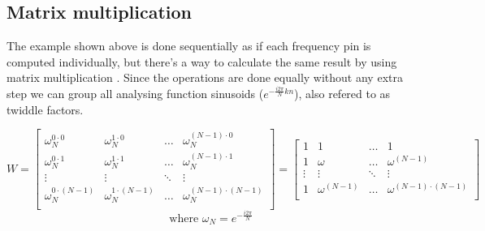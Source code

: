 \documentclass[
  oneside,
  11pt, a4paper,
  footinclude=true,
  headinclude=true,
  cleardoublepage=empty
]{scrbook}
\begin{document}

\subsection{Matrix multiplication} \label{subsec:matrix-multiplication}
The example shown above is done sequentially as if each frequency pin is computed individually, but there's a way to calculate the same result by using matrix multiplication \cite{rao2018transform}. Since the operations are done equally without any extra step we can group all analysing function sinusoids (\(e^{- \frac{i 2 \pi}{N} k n}\)), also refered to as twiddle factors.


\begin{equation*}
    W = 
    \begin{bmatrix}
        \omega_{N}^{0 \cdot 0}     & \omega_{N}^{1 \cdot 0}     & \dots  & \omega_{N}^{(N-1) \cdot 0}     \\
        \omega_{N}^{0 \cdot 1}     & \omega_{N}^{1 \cdot 1}     & \dots  & \omega_{N}^{(N-1) \cdot 1}     \\
        \vdots                     & \vdots                     & \ddots & \vdots                          \\
        \omega_{N}^{0 \cdot (N-1)} & \omega_{N}^{1 \cdot (N-1)} & \dots  & \omega_{N}^{(N-1) \cdot (N-1)} \\
    \end{bmatrix} =
    \begin{bmatrix}
        1      & 1              & \dots  & 1                          \\
        1      & \omega         & \dots  & \omega^{(N-1)}             \\
        \vdots & \vdots         & \ddots & \vdots                     \\
        1      & \omega^{(N-1)} & \dots  & \omega^{(N-1) \cdot (N-1)} \\
    \end{bmatrix}
\end{equation*}
\begin{equation*}
    \text{where } \omega_{N} = e^{- \frac{i 2 \pi}{N}}
\end{equation*}
\end{document}
